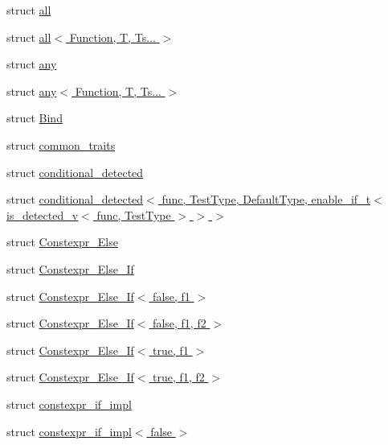 \begin{DoxyCompactItemize}
\item 
struct \hyperlink{structBC_1_1meta_1_1all}{all}
\item 
struct \hyperlink{structBC_1_1meta_1_1all_3_01Function_00_01T_00_01Ts_8_8_8_01_4}{all$<$ Function, T, Ts... $>$}
\item 
struct \hyperlink{structBC_1_1meta_1_1any}{any}
\item 
struct \hyperlink{structBC_1_1meta_1_1any_3_01Function_00_01T_00_01Ts_8_8_8_01_4}{any$<$ Function, T, Ts... $>$}
\item 
struct \hyperlink{structBC_1_1meta_1_1Bind}{Bind}
\item 
struct \hyperlink{structBC_1_1meta_1_1common__traits}{common\+\_\+traits}
\item 
struct \hyperlink{structBC_1_1meta_1_1conditional__detected}{conditional\+\_\+detected}
\item 
struct \hyperlink{structBC_1_1meta_1_1conditional__detected_3_01func_00_01TestType_00_01DefaultType_00_01enable__i6e3832bf86481f306f12e7d1b8047f13}{conditional\+\_\+detected$<$ func, Test\+Type, Default\+Type, enable\+\_\+if\+\_\+t$<$ is\+\_\+detected\+\_\+v$<$ func, Test\+Type $>$ $>$ $>$}
\item 
struct \hyperlink{structBC_1_1meta_1_1Constexpr__Else}{Constexpr\+\_\+\+Else}
\item 
struct \hyperlink{structBC_1_1meta_1_1Constexpr__Else__If}{Constexpr\+\_\+\+Else\+\_\+\+If}
\item 
struct \hyperlink{structBC_1_1meta_1_1Constexpr__Else__If_3_01false_00_01f1_01_4}{Constexpr\+\_\+\+Else\+\_\+\+If$<$ false, f1 $>$}
\item 
struct \hyperlink{structBC_1_1meta_1_1Constexpr__Else__If_3_01false_00_01f1_00_01f2_01_4}{Constexpr\+\_\+\+Else\+\_\+\+If$<$ false, f1, f2 $>$}
\item 
struct \hyperlink{structBC_1_1meta_1_1Constexpr__Else__If_3_01true_00_01f1_01_4}{Constexpr\+\_\+\+Else\+\_\+\+If$<$ true, f1 $>$}
\item 
struct \hyperlink{structBC_1_1meta_1_1Constexpr__Else__If_3_01true_00_01f1_00_01f2_01_4}{Constexpr\+\_\+\+Else\+\_\+\+If$<$ true, f1, f2 $>$}
\item 
struct \hyperlink{structBC_1_1meta_1_1constexpr__if__impl}{constexpr\+\_\+if\+\_\+impl}
\item 
struct \hyperlink{structBC_1_1meta_1_1constexpr__if__impl_3_01false_01_4}{constexpr\+\_\+if\+\_\+impl$<$ false $>$}
\item 

\end{DoxyCompactItemize}
